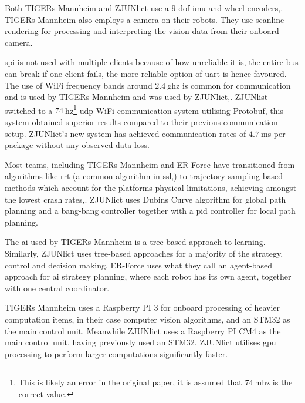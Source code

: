 Both TIGERs Mannheim and ZJUNlict use a $9$-\ac{dof} \ac{imu} and wheel encoders\:\cite{huang_zjunlict_2019},\cite{alami_robocup_2022}. TIGERs Mannheim also employs a camera on their robots\:\cite{alami_robocup_2022}.
They use scanline rendering for processing and interpreting the vision data from their onboard camera\:\cite{ryll_extended_2020}.

\ac{spi} is not used with multiple clients because of how unreliable it is, the entire bus can break if one client fails, the more reliable option of \ac{uart} is hence favoured\:\cite{ryll_extended_2020}. The use of WiFi frequency bands around $2.4\:$\ac{ghz} is common for communication and is used by TIGERs Mannheim and was used by ZJUNlict\:\cite{ommer_extended_2024},\cite{zhao_zjunlict_2024}. ZJUNlist switched to a $74\:$\ac{hz}\footnote{This is likely an error in the original paper, it is assumed that $74\:$\ac{mhz} is the correct value.} \ac{udp} WiFi communication system utilising Protobuf, this system obtained superior results compared to their previous communication setup\:\cite{zhao_zjunlict_2024}. ZJUNlict's new system has achieved communication rates of $4.7\:$\ac{ms} per package without any observed data loss\:\cite{zhao_zjunlict_2024}.

Most teams, including TIGERs Mannheim and ER-Force have transitioned from algorithms like \ac{rrt} (a common algorithm in \ac{ssl}\:\cite{ommer_extended_2019},\cite{wendler_er-force_2020}) to trajectory-sampling-based methods which account for the platforms physical limitations, achieving amongst the lowest crash rates\:\cite{ommer_extended_2024},\cite{wendler_er-force_2020}. ZJUNlict uses Dubins Curve algorithm for global path planning and a bang-bang controller together with a \ac{pid} controller for local path planning\:\cite{huang_zjunlict_2023}.

The \ac{ai} used by TIGERs Mannheim is a tree-based approach to learning\:\cite{ryll_extended_2018}. Similarly, ZJUNlict uses tree-based approaches for a majority of the strategy, control and decision making\:\cite{chen_zjunlict_2018}. ER-Force uses what they call an agent-based approach for \ac{ai} strategy planning, where each robot has its own agent, together with one central coordinator\:\cite{lobmeier_er-force_2018}.

TIGERs Mannheim uses a Raspberry PI 3 for onboard processing of heavier computation items, in their case computer vision algorithms\:\cite{ryll_extended_2020}, and an STM32 as the main control unit\:\cite{ommer_extended_2024}. Meanwhile ZJUNlict uses a Raspberry PI CM4 as the main control unit, having previously used an STM32\:\cite{zhao_zjunlict_2024}. ZJUNlict utilises \ac{gpu} processing to perform larger computations significantly faster\:\cite{huang_zjunlict_2020}. 

